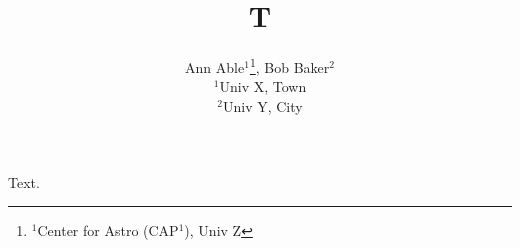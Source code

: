 \documentclass{article}
\begin{document}
\title{T}
\author{Ann Able$^{1}$\thanks{$^1$Center for Astro (CAP$^1$), Univ Z}, Bob Baker$^{2}$ \\ $^1$Univ X, Town \\ $^2$Univ Y, City}
\maketitle
Text.
\end{document}
